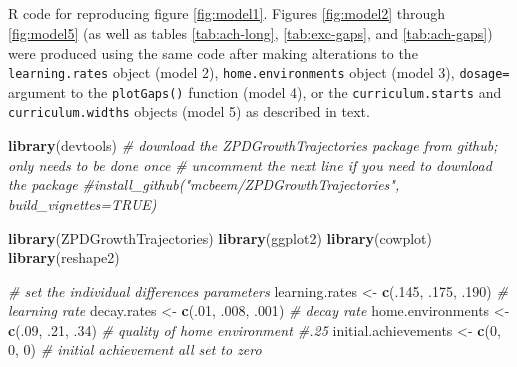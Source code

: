 \documentclass[english,floatsintext,jou]{apa6}
\newenvironment{Shaded}{\begin{snugshade}}{\end{snugshade}}
\newcommand{\KeywordTok}[1]{\textcolor[rgb]{0.13,0.29,0.53}{\textbf{{#1}}}}
\newcommand{\DecValTok}[1]{\textcolor[rgb]{0.00,0.00,0.81}{{#1}}}
\newcommand{\StringTok}[1]{\textcolor[rgb]{0.31,0.60,0.02}{{#1}}}
\newcommand{\CommentTok}[1]{\textcolor[rgb]{0.56,0.35,0.01}{\textit{{#1}}}}
\newcommand{\NormalTok}[1]{{#1}}
\theoremstyle{definition}
\theoremstyle{definition}
\theoremstyle{definition}
\theoremstyle{remark}
\begin{document}
\begin{appendix}
\section{}
R code for reproducing figure \ref{fig:model1}. Figures \ref{fig:model2}
through \ref{fig:model5} (as well as tables \ref{tab:ach-long},
\ref{tab:exc-gaps}, and \ref{tab:ach-gaps}) were produced using the same
code after making alterations to the \texttt{learning.rates} object
(model 2), \texttt{home.environments} object (model 3), \texttt{dosage=}
argument to the \texttt{plotGaps()} function (model 4), or the
\texttt{curriculum.starts} and \texttt{curriculum.widths} objects (model
5) as described in text.

\tiny

\begin{Shaded}
\begin{Highlighting}[]
\KeywordTok{library}\NormalTok{(devtools)}
\CommentTok{# download the ZPDGrowthTrajectories package from github; only needs to be done once}
\CommentTok{# uncomment the next line if you need to download the package}
\CommentTok{#install_github("mcbeem/ZPDGrowthTrajectories", build_vignettes=TRUE)}

\KeywordTok{library}\NormalTok{(ZPDGrowthTrajectories)}
\KeywordTok{library}\NormalTok{(ggplot2)}
\KeywordTok{library}\NormalTok{(cowplot)}
\KeywordTok{library}\NormalTok{(reshape2)}

\CommentTok{# set the individual differences parameters}
\NormalTok{learning.rates <-}\StringTok{ }\KeywordTok{c}\NormalTok{(.}\DecValTok{145}\NormalTok{, .}\DecValTok{175}\NormalTok{, .}\DecValTok{190}\NormalTok{) }\CommentTok{# learning rate }
\NormalTok{decay.rates <-}\StringTok{ }\KeywordTok{c}\NormalTok{(.}\DecValTok{01}\NormalTok{, .}\DecValTok{008}\NormalTok{, .}\DecValTok{001}\NormalTok{) }\CommentTok{# decay rate}
\NormalTok{home.environments <-}\StringTok{ }\KeywordTok{c}\NormalTok{(.}\DecValTok{09}\NormalTok{, .}\DecValTok{21}\NormalTok{, .}\DecValTok{34}\NormalTok{) }\CommentTok{# quality of home environment #.25}
\NormalTok{initial.achievements <-}\StringTok{ }\KeywordTok{c}\NormalTok{(}\DecValTok{0}\NormalTok{, }\DecValTok{0}\NormalTok{, }\DecValTok{0}\NormalTok{) }\CommentTok{# initial achievement all set to zero}


\end{Highlighting}
\end{Shaded}
\end{appendix}
\end{document}
